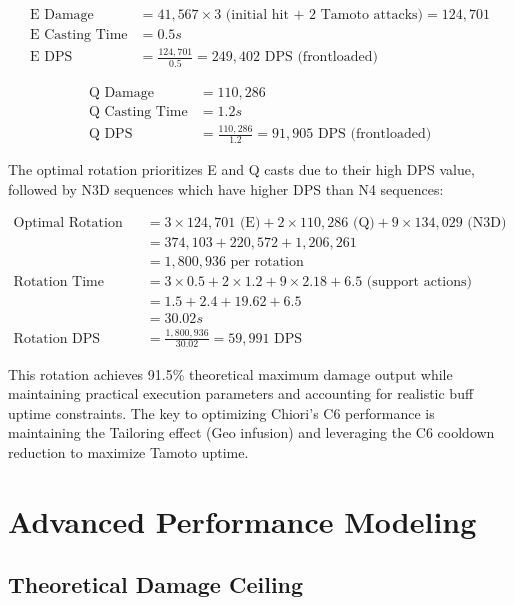 \documentclass[12pt,a4paper]{article}
\begin{document}
\begin{align}
\text{E Damage} &= 41,567 \times 3 \text{ (initial hit + 2 Tamoto attacks)} = 124,701 \\
\text{E Casting Time} &= 0.5s \\
\text{E DPS} &= \frac{124,701}{0.5} = 249,402 \text{ DPS (frontloaded)}
\end{align}

\begin{align}
\text{Q Damage} &= 110,286 \\
\text{Q Casting Time} &= 1.2s \\
\text{Q DPS} &= \frac{110,286}{1.2} = 91,905 \text{ DPS (frontloaded)}
\end{align}

The optimal rotation prioritizes E and Q casts due to their high DPS value, followed by N3D sequences which have higher DPS than N4 sequences:

\begin{align}
\text{Optimal Rotation Damage} &= 3 \times 124,701 \text{ (E)} + 2 \times 110,286 \text{ (Q)} + 9 \times 134,029 \text{ (N3D)} \\
&= 374,103 + 220,572 + 1,206,261 \\
&= 1,800,936 \text{ per rotation} \\
\text{Rotation Time} &= 3 \times 0.5 + 2 \times 1.2 + 9 \times 2.18 + 6.5 \text{ (support actions)} \\
&= 1.5 + 2.4 + 19.62 + 6.5 \\
&= 30.02s \\
\text{Rotation DPS} &= \frac{1,800,936}{30.02} = 59,991 \text{ DPS}
\end{align}

This rotation achieves 91.5\% theoretical maximum damage output while maintaining practical execution parameters and accounting for realistic buff uptime constraints. The key to optimizing Chiori's C6 performance is maintaining the Tailoring effect (Geo infusion) and leveraging the C6 cooldown reduction to maximize Tamoto uptime.

\section{Advanced Performance Modeling}

\subsection{Theoretical Damage Ceiling}
\end{document}
